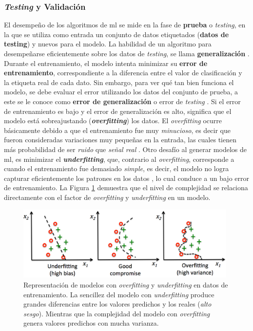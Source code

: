 \subsubsection{\emph{Testing} y Validación}
El desempeño de los algoritmos de \acrshort{ml} se mide en la fase de \textbf{prueba} o \emph{testing}, en la que se utiliza como entrada un conjunto de datos etiquetados (\textbf{datos de testing}) y nuevos para el modelo. La habilidad de un algoritmo para desempeñarse eficientemente sobre los datos de \emph{testing}, se llama \textbf{generalización} \cite{Goodfellow}. Durante el entrenamiento, el modelo intenta minimizar su \textbf{error de entrenamiento}, correspondiente a la diferencia entre el valor de clasificación y la etiqueta real de cada dato. Sin embargo, para ver qué tan bien funciona el modelo, se debe evaluar el error utilizando los datos del conjunto de prueba, a este se le conoce como \textbf{error de generalización} o error de \emph{testing} \cite{Geron}.     
%
Si el error de entrenamiento es bajo y el error de generalización es alto, significa que el modelo está sobreajustando (\textbf{\emph{overfitting}}) los datos. El \emph{overfitting} ocurre básicamente debido a que el entrenamiento fue muy \textit{minucioso}, es decir que fueron consideradas variaciones muy pequeñas en la entrada, las cuales tienen más probabilidad de ser \textit{ruido} que \textit{señal real} \cite{Murphy}. Otro desafío al generar modelos de \acrshort{ml}, es minimizar el \textbf{\emph{underfitting}}, que, contrario al \emph{overfitting}, corresponde a cuando el entrenamiento fue demasiado \textit{simple}, es decir, el modelo no logra capturar eficientemente los patrones en los datos \cite{Raschka}, lo cual conduce a un bajo error de entrenamiento. La Figura \ref{fig:ovund} demuestra que el nivel de complejidad se relaciona directamente con el factor de \emph{overfitting} y \emph{underfitting} en un modelo.

\begin{figure}[h]
  \centering
  \includegraphics[width=11cm]{figures/image18.png}
  \caption[Representación de modelos con \emph{overfitting} y \emph{underfitting}.]{Representación de modelos con \emph{overfitting} y \emph{underfitting} en datos de entrenamiento. La sencillez del modelo con \emph{underfitting} produce grandes diferencias entre los valores predichos y los reales (\textit{alto sesgo}). Mientras que la complejidad del modelo con \emph{overfitting} genera valores predichos con mucha varianza.
  }
  \label{fig:ovund}
\end{figure}

